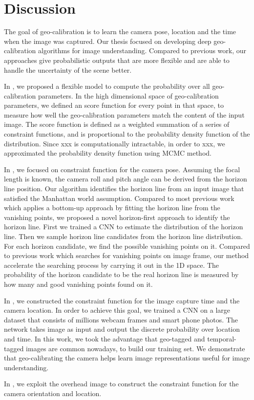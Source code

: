 \chapter{Discussion}
\label{chap:discussion}

The goal of geo-calibration is to learn the camera pose, location and
the time when the image was captured.
Our thesis focused on developing deep geo-calibration algorithms for
image understanding.
Compared to previous work, our approaches give
probabilistic outputs that are more flexible and are able to handle
the uncertainty of the scene better.

In , we proposed a flexible model to compute the
probability over all geo-calibration parameters. In the high
dimensional space of geo-calibration parameters, we defined an score
function for every point in that space, to measure how well the
geo-calibration parameters match the content of the input image. The
score function is defined as a weighted summation of a series of
constraint functions, and is proportional to the probability density
function of the distribution. Since xxx is computationally
intractable, in order to xxx, we approximated the probability
density function using MCMC method.

In , we focused on constraint function for the
camera pose. Assuming the focal length is known, the camera roll and
pitch angle can be derived from the horizon line position. Our
algorithm identifies the horizon line from an input image that
satisfied the Manhattan world assumption.
Compared to most previous work which applies a bottom-up approach by
fitting the horizon line from the vanishing points, we proposed a
novel horizon-first approach to identify the horizon line.
First we trained a CNN to estimate the distribution of the horizon
line. Then we sample horizon line candidates from the horizon line
distribution. For each horizon candidate, we find the possible
vanishing points on it. Compared to previous work which searches for 
vanishing points on image frame, our method accelerate the searching
process by carrying it out in the 1D space. The probability of the
horizon candidate to be the real horizon line is measured by how many
and good vanishing points found on it. 

In , we constructed the constraint function for 
the image capture time and the camera location. In order to achieve
this goal, we trained a CNN on a large dataset that consists of
millions webcam frames and smart phone photos. The network takes image
as input and output the discrete probability over location and time.
In this work, we took the advantage that geo-tagged and
temporal-tagged images are common nowadays, to build our training set.
We demonstrate that geo-calibrating the camera helps learn image
representations useful for image understanding.

In , we exploit the overhead image to construct
the constraint function for the camera orientation and location.
